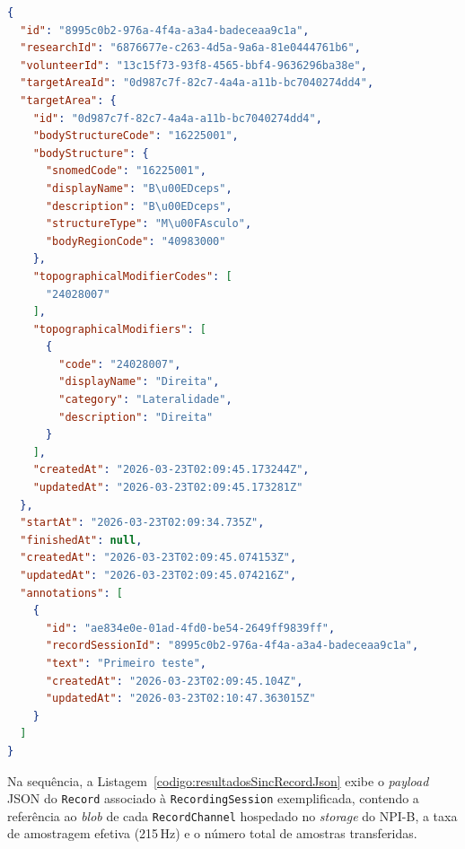 \begin{sourcecode}[htpb]
\caption{\label{codigo:resultadosSincPayloadJson}Excerto do \textit{payload} JSON de uma \texttt{Session} exportada do NPI-A para o NPI-B.}
\begin{lstlisting}[frame=single, language=json]
{
  "id": "8995c0b2-976a-4f4a-a3a4-badeceaa9c1a",
  "researchId": "6876677e-c263-4d5a-9a6a-81e0444761b6",
  "volunteerId": "13c15f73-93f8-4565-bbf4-9636296ba38e",
  "targetAreaId": "0d987c7f-82c7-4a4a-a11b-bc7040274dd4",
  "targetArea": {
    "id": "0d987c7f-82c7-4a4a-a11b-bc7040274dd4",
    "bodyStructureCode": "16225001",
    "bodyStructure": {
      "snomedCode": "16225001",
      "displayName": "B\u00EDceps",
      "description": "B\u00EDceps",
      "structureType": "M\u00FAsculo",
      "bodyRegionCode": "40983000"
    },
    "topographicalModifierCodes": [
      "24028007"
    ],
    "topographicalModifiers": [
      {
        "code": "24028007",
        "displayName": "Direita",
        "category": "Lateralidade",
        "description": "Direita"
      }
    ],
    "createdAt": "2026-03-23T02:09:45.173244Z",
    "updatedAt": "2026-03-23T02:09:45.173281Z"
  },
  "startAt": "2026-03-23T02:09:34.735Z",
  "finishedAt": null,
  "createdAt": "2026-03-23T02:09:45.074153Z",
  "updatedAt": "2026-03-23T02:09:45.074216Z",
  "annotations": [
    {
      "id": "ae834e0e-01ad-4fd0-be54-2649ff9839ff",
      "recordSessionId": "8995c0b2-976a-4f4a-a3a4-badeceaa9c1a",
      "text": "Primeiro teste",
      "createdAt": "2026-03-23T02:09:45.104Z",
      "updatedAt": "2026-03-23T02:10:47.363015Z"
    }
  ]
}
\end{lstlisting}
\end{sourcecode}

Na sequência, a Listagem~\ref{codigo:resultadosSincRecordJson} exibe o \textit{payload} JSON do \texttt{Record} associado à \texttt{RecordingSession} exemplificada, contendo a referência ao \textit{blob} de cada \texttt{RecordChannel} hospedado no \textit{storage} do NPI-B, a taxa de amostragem efetiva (215\,Hz) e o número total de amostras transferidas.

